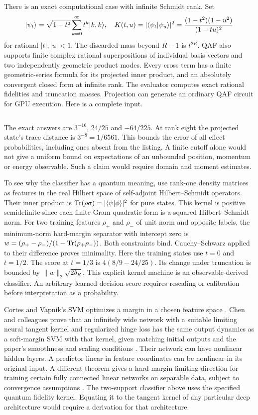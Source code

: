 There is an exact computational case with infinite Schmidt rank. Set
\[
 \lvert \psi_t\rangle=\sqrt{1-t^2}\sum_{k=0}^{\infty}t^k\lvert k,k\rangle,\quad
 K(t,u)=|\langle\psi_t|\psi_u\rangle|^2
       ={(1-t^2)(1-u^2)\over(1-tu)^2}
\]
for rational $|t|,|u|<1$. The discarded mass beyond $R-1$ is $t^{2R}$. QAF also supports finite complex rational superpositions of individual basis vectors and two independently geometric product modes. Every cross term has a finite geometric-series formula for its projected inner product, and an absolutely convergent closed form at infinite rank. The evaluator computes exact rational fidelities and truncation masses. Projection can generate an ordinary QAF circuit for GPU execution. Here is a complete input.
\inputminted{qaf}{../../examples/prefix/hilbert.qaf}
The exact answers are $3^{-16}$, $24/25$ and $-64/225$. At rank eight the projected state's trace distance is $3^{-8}=1/6561$. This bounds the error of all effect probabilities, including ones absent from the listing. A finite cutoff alone would not give a uniform bound on expectations of an unbounded position, momentum or energy observable. Such a claim would require domain and moment estimates.

To see why the classifier has a quantum meaning, use rank-one density matrices as features in the real Hilbert space of self-adjoint Hilbert--Schmidt operators. Their inner product is $\operatorname{Tr}(\rho\sigma)=|\langle\psi|\phi\rangle|^2$ for pure states. This kernel is positive semidefinite since each finite Gram quadratic form is a squared Hilbert--Schmidt norm. For two training features $\rho_+$ and $\rho_-$ of unit norm and opposite labels, the minimum-norm hard-margin separator with intercept zero is $w=(\rho_+-\rho_-)/(1-\operatorname{Tr}(\rho_+\rho_-))$. Both constraints bind. Cauchy--Schwarz applied to their difference proves minimality. Here the training states use $t=0$ and $t=1/2$. The score at $t=1/3$ is $4(8/9-24/25)$. Its change under truncation is bounded by $\|w\|_2\sqrt{2\delta_R}$. This explicit kernel machine is an observable-derived classifier. An arbitrary learned decision score requires rescaling or calibration before interpretation as a probability.

Cortes and Vapnik's SVM optimizes a margin in a chosen feature space \cite{svm}. Chen and colleagues prove that an infinitely wide network with a suitable limiting neural tangent kernel and regularized hinge loss has the same output dynamics as a soft-margin SVM with that kernel, given matching initial outputs and the paper's smoothness and scaling conditions \cite{chen,ntk}. Their network can have nonlinear hidden layers. A predictor linear in feature coordinates can be nonlinear in its original input. A different theorem gives a hard-margin limiting direction for training certain fully connected linear networks on separable data, subject to convergence assumptions \cite{gunasekar}. The two-support classifier above uses the specified quantum fidelity kernel. Equating it to the tangent kernel of any particular deep architecture would require a derivation for that architecture.

